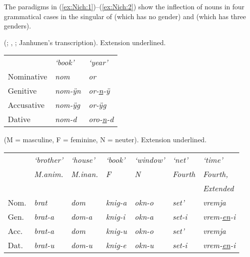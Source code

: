 \documentclass[output=collectionpaper]{langsci/langscibook}
\begin{document}
The paradigms in (\ref{ex:Nich:1})--(\ref{ex:Nich:2}) show the inflection of nouns in four grammatical cases in the singular of  (which has no gender) and  (which has three genders).

\ea
\label{ex:Nich:1}
 (; \citealt[163]{Svantesson2003}, \citealt[297--298, 106--112, 66--68]{Janhunen2012}; Janhunen's transcription). Extension underlined.\\
\medskip
\begin{tabular}{l>{\itshape}l>{\itshape}l}
			 & \normalfont `book'	 & \normalfont `year'			\\
	Nominative &	nom	 &	or	\\
	Genitive	 &	nom-ÿn &	or-\underline{n}-ÿ	\\
	Accusative &		nom-ÿg &	or-ÿg		\\
	Dative	 &	nom-d	 &	oro-\underline{n}-d
\end{tabular}
\z

\ea
\label{ex:Nich:2}
 (M = masculine, F = feminine, N = neuter). Extension underlined.\\
\medskip
\begin{tabular}{l*{6}{>{\itshape}l}}
	 &	\normalfont `brother'	 &\normalfont `house' &\normalfont 	`book' &	\normalfont `window'	 &\normalfont `net'	 &\normalfont `time'\\
	 &\normalfont 	M.anim. &\normalfont 	M.inan.	 &\normalfont F	 &\normalfont N	 &\normalfont Fourth &\normalfont 	Fourth, \\
	 &&&&&&\normalfont Extended\\
	Nom.	 &brat &	dom	 &knig-a	 &okn-o &	set'	 &vremja	\\
	Gen.	 &brat-a	 &dom-a &	knig-i &	okn-a	 &set-i	 &vrem-\underline{en}-i\\
	Acc.	 &brat-a	 &dom &	knig-u	 &okn-o	 &set'	 &vremja\\
	Dat.	 &brat-u &	dom-u	 &knig-e &	okn-u &	set-i	 &vrem-\underline{en}-i
\end{tabular}
\z
\end{document}

